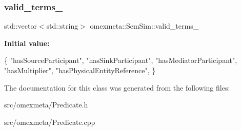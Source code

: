 \subsubsection{\texorpdfstring{valid\+\_\+terms\+\_\+}{valid\_terms\_}}
{\footnotesize\ttfamily std\+::vector$<$std\+::string$>$ omexmeta\+::\+Sem\+Sim\+::valid\+\_\+terms\+\_\+}

{\bfseries Initial value\+:}
\begin{DoxyCode}
\{
                \textcolor{stringliteral}{"hasSourceParticipant"},
                \textcolor{stringliteral}{"hasSinkParticipant"},
                \textcolor{stringliteral}{"hasMediatorParticipant"},
                \textcolor{stringliteral}{"hasMultiplier"},
                \textcolor{stringliteral}{"hasPhysicalEntityReference"},
        \}
\end{DoxyCode}


The documentation for this class was generated from the following files\+:\begin{DoxyCompactItemize}
\item 
src/omexmeta/Predicate.\+h\item 
src/omexmeta/Predicate.\+cpp\end{DoxyCompactItemize}
